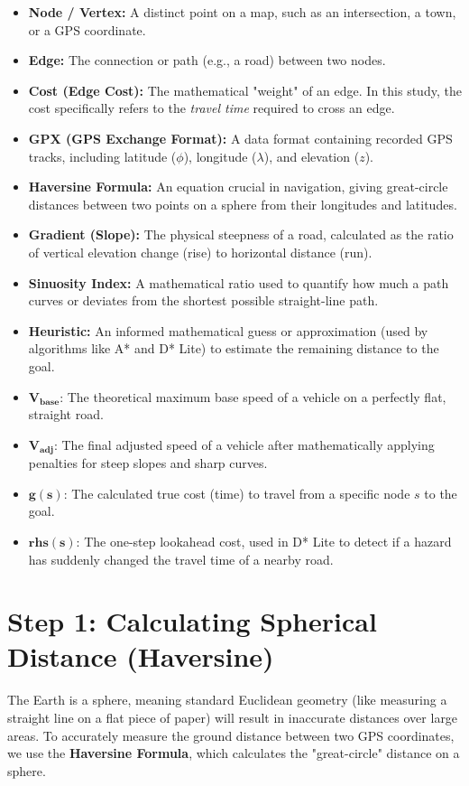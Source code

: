 \documentclass[12pt, a4paper]{article}
\begin{document}
\begin{itemize}
    \item \textbf{Node / Vertex:} A distinct point on a map, such as an intersection, a town, or a GPS coordinate.
    \item \textbf{Edge:} The connection or path (e.g., a road) between two nodes.
    \item \textbf{Cost (Edge Cost):} The mathematical "weight" of an edge. In this study, the cost specifically refers to the \textit{travel time} required to cross an edge.
    \item \textbf{GPX (GPS Exchange Format):} A data format containing recorded GPS tracks, including latitude ($\phi$), longitude ($\lambda$), and elevation ($z$).
    \item \textbf{Haversine Formula:} An equation crucial in navigation, giving great-circle distances between two points on a sphere from their longitudes and latitudes.
    \item \textbf{Gradient (Slope):} The physical steepness of a road, calculated as the ratio of vertical elevation change (rise) to horizontal distance (run).
    \item \textbf{Sinuosity Index:} A mathematical ratio used to quantify how much a path curves or deviates from the shortest possible straight-line path.
    \item \textbf{Heuristic:} An informed mathematical guess or approximation (used by algorithms like A* and D* Lite) to estimate the remaining distance to the goal.
    \item $\boldsymbol{V_{base}}$: The theoretical maximum base speed of a vehicle on a perfectly flat, straight road.
    \item $\boldsymbol{V_{adj}}$: The final adjusted speed of a vehicle after mathematically applying penalties for steep slopes and sharp curves.
    \item $\boldsymbol{g(s)}$: The calculated true cost (time) to travel from a specific node $s$ to the goal.
    \item $\boldsymbol{rhs(s)}$: The one-step lookahead cost, used in D* Lite to detect if a hazard has suddenly changed the travel time of a nearby road.
\end{itemize}
\section{Step 1: Calculating Spherical Distance (Haversine)}
The Earth is a sphere, meaning standard Euclidean geometry (like measuring a straight line on a flat piece of paper) will result in inaccurate distances over large areas. To accurately measure the ground distance between two GPS coordinates, we use the \textbf{Haversine Formula}, which calculates the "great-circle" distance on a sphere.
\end{document}
